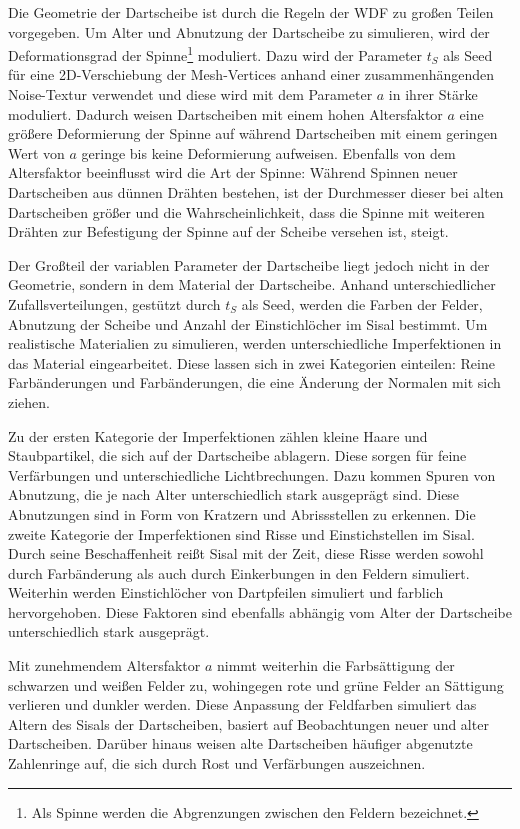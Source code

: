 Die Geometrie der Dartscheibe ist durch die Regeln der \ac{WDF} zu großen Teilen vorgegeben. Um Alter und Abnutzung der Dartscheibe zu simulieren, wird der Deformationsgrad der Spinne\footnote{Als Spinne werden die Abgrenzungen zwischen den Feldern bezeichnet.} moduliert. Dazu wird der Parameter $t_S$ als Seed für eine 2D-Verschiebung der Mesh-Vertices anhand einer zusammenhängenden Noise-Textur verwendet und diese wird mit dem Parameter $a$ in ihrer Stärke moduliert. Dadurch weisen Dartscheiben mit einem hohen Altersfaktor $a$ eine größere Deformierung der Spinne auf während Dartscheiben mit einem geringen Wert von $a$ geringe bis keine Deformierung aufweisen. Ebenfalls von dem Altersfaktor beeinflusst wird die Art der Spinne: Während Spinnen neuer Dartscheiben aus dünnen Drähten bestehen, ist der Durchmesser dieser bei alten Dartscheiben größer und die Wahrscheinlichkeit, dass die Spinne mit weiteren Drähten zur Befestigung der Spinne auf der Scheibe versehen ist, steigt.

Der Großteil der variablen Parameter der Dartscheibe liegt jedoch nicht in der Geometrie, sondern in dem Material der Dartscheibe. Anhand unterschiedlicher Zufallsverteilungen, gestützt durch $t_S$ als Seed, werden die Farben der Felder, Abnutzung der Scheibe und Anzahl der Einstichlöcher im Sisal bestimmt.
Um realistische Materialien zu simulieren, werden unterschiedliche Imperfektionen in das Material eingearbeitet. Diese lassen sich in zwei Kategorien einteilen: Reine Farbänderungen und Farbänderungen, die eine Änderung der Normalen mit sich ziehen.

Zu der ersten Kategorie der Imperfektionen zählen kleine Haare und Staubpartikel, die sich auf der Dartscheibe ablagern. Diese sorgen für feine Verfärbungen und unterschiedliche Lichtbrechungen. Dazu kommen Spuren von Abnutzung, die je nach Alter unterschiedlich stark ausgeprägt sind. Diese Abnutzungen sind in Form von Kratzern und Abrissstellen zu erkennen.
Die zweite Kategorie der Imperfektionen sind Risse und Einstichstellen im Sisal. Durch seine Beschaffenheit reißt Sisal mit der Zeit, diese Risse werden sowohl durch Farbänderung als auch durch Einkerbungen in den Feldern simuliert. Weiterhin werden Einstichlöcher von Dartpfeilen simuliert und farblich hervorgehoben. Diese Faktoren sind ebenfalls abhängig vom Alter der Dartscheibe unterschiedlich stark ausgeprägt.

Mit zunehmendem Altersfaktor $a$ nimmt weiterhin die Farbsättigung der schwarzen und weißen Felder zu, wohingegen rote und grüne Felder an Sättigung verlieren und dunkler werden. Diese Anpassung der Feldfarben simuliert das Altern des Sisals der Dartscheiben, basiert auf Beobachtungen neuer und alter Dartscheiben. Darüber hinaus weisen alte Dartscheiben häufiger abgenutzte Zahlenringe auf, die sich durch Rost und Verfärbungen auszeichnen.

